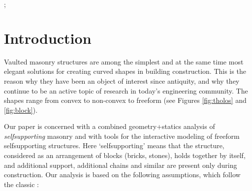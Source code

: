 \documentclass[annual]{acmsiggraph}
\newcommand{\todo}[1]{\textcolor{red}{#1}}
\begin{document}

\begin{CRcatlist}
  ;
\end{CRcatlist}


\keywordlist


\TOGlinkslist


\copyrightspace


\section{Introduction}



Vaulted masonry structures are among the simplest and at the same time
most elegant solutions for creating curved shapes in building
construction. This is the reason why they have been an object of interest
since antiquity, and why they continue to be an active topic of research
in today's engineering community. The shapes range from convex to
non-convex to freeform (see Figures \ref{fig:tholos} and \ref{fig:block}).


Our paper is concerned with a combined geometry+statics analysis of {\em
self\dash supporting} masonry and with tools for the interactive modeling
of freeform self\dash supporting structures. Here `self\dash supporting'
means that the structure, considered as an arrangement of blocks (bricks,
stones), holds together by itself, and additional support, additional
chains and similar are present only during construction. Our analysis is
based on the following assumptions, which follow the classic
\cite{Heyman66}:
\end{document}
